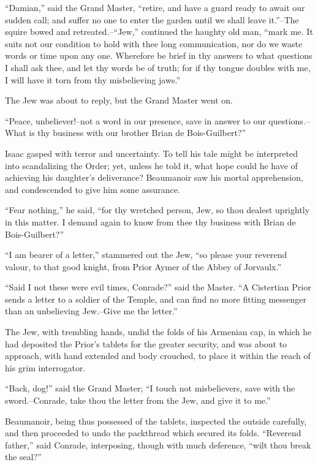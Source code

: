 ``Damian,'' said the Grand Master, ``retire, and have a guard ready to
await our sudden call; and suffer no one to enter the garden until we
shall leave it.''--The squire bowed and retreated.--``Jew,'' continued
the haughty old man, ``mark me. It suits not our condition to hold with
thee long communication, nor do we waste words or time upon any one.
Wherefore be brief in thy answers to what questions I shall ask thee,
and let thy words be of truth; for if thy tongue doubles with me, I will
have it torn from thy misbelieving jaws.''

The Jew was about to reply, but the Grand Master went on.

``Peace, unbeliever!--not a word in our presence, save in answer to our
questions.--What is thy business with our brother Brian de
Bois-Guilbert?''

Isaac gasped with terror and uncertainty. To tell his tale might be
interpreted into scandalizing the Order; yet, unless he told it, what
hope could he have of achieving his daughter's deliverance? Beaumanoir
saw his mortal apprehension, and condescended to give him some
assurance.

``Fear nothing,'' he said, ``for thy wretched person, Jew, so thou
dealest uprightly in this matter. I demand again to know from thee thy
business with Brian de Bois-Guilbert?''

``I am bearer of a letter,'' stammered out the Jew, ``so please your
reverend valour, to that good knight, from Prior Aymer of the Abbey of
Jorvaulx.''

``Said I not these were evil times, Conrade?'' said the Master. ``A
Cistertian Prior sends a letter to a soldier of the Temple, and can find
no more fitting messenger than an unbelieving Jew.--Give me the
letter.''

The Jew, with trembling hands, undid the folds of his Armenian cap, in
which he had deposited the Prior's tablets for the greater security, and
was about to approach, with hand extended and body crouched, to place it
within the reach of his grim interrogator.

``Back, dog!'' said the Grand Master; ``I touch not misbelievers, save
with the sword.--Conrade, take thou the letter from the Jew, and give it
to me.''

Beaumanoir, being thus possessed of the tablets, inspected the outside
carefully, and then proceeded to undo the packthread which secured its
folds. ``Reverend father,'' said Conrade, interposing, though with much
deference, ``wilt thou break the seal?''

